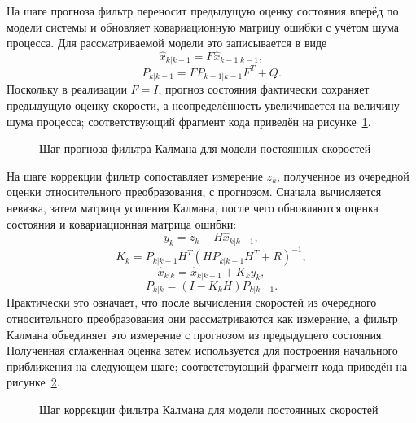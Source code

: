 На шаге прогноза фильтр переносит предыдущую оценку состояния вперёд по модели системы и обновляет ковариационную матрицу ошибки с учётом шума процесса. Для рассматриваемой модели это записывается в виде
\begin{equation}
    \hat{x}_{k|k-1} = F \hat{x}_{k-1|k-1},
\end{equation}
\begin{equation}
    P_{k|k-1} = F P_{k-1|k-1} F^T + Q.
\end{equation}
Поскольку в реализации $F = I$, прогноз состояния фактически сохраняет предыдущую оценку скорости, а неопределённость увеличивается на величину шума процесса; соответствующий фрагмент кода приведён на рисунке~\ref{lst:kalman-predict}.

\begin{figure}
  \fontsize{12pt}{14pt}\selectfont
  
  \caption{Шаг прогноза фильтра Калмана для модели постоянных скоростей}
  \label{lst:kalman-predict}
\end{figure}

На шаге коррекции фильтр сопоставляет измерение $z_k$, полученное из очередной оценки относительного преобразования, с прогнозом. Сначала вычисляется невязка, затем матрица усиления Калмана, после чего обновляются оценка состояния и ковариационная матрица ошибки:
\begin{equation}
    y_k = z_k - H \hat{x}_{k|k-1},
\end{equation}
\begin{equation}
    K_k = P_{k|k-1} H^T \left(H P_{k|k-1} H^T + R\right)^{-1},
\end{equation}
\begin{equation}
    \hat{x}_{k|k} = \hat{x}_{k|k-1} + K_k y_k,
\end{equation}
\begin{equation}
    P_{k|k} = \left(I - K_k H\right) P_{k|k-1}.
\end{equation}
Практически это означает, что после вычисления скоростей из очередного относительного преобразования они рассматриваются как измерение, а фильтр Калмана объединяет это измерение с прогнозом из предыдущего состояния. Полученная сглаженная оценка затем используется для построения начального приближения на следующем шаге; соответствующий фрагмент кода приведён на рисунке~\ref{lst:kalman-update}.

\begin{figure}
  \fontsize{12pt}{14pt}\selectfont
  
  \caption{Шаг коррекции фильтра Калмана для модели постоянных скоростей}
  \label{lst:kalman-update}
\end{figure}

